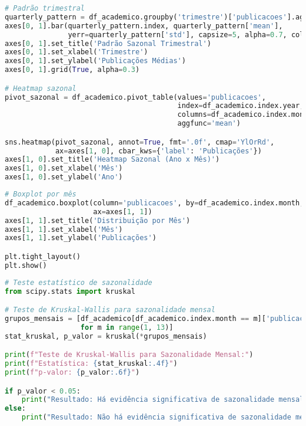 \begin{pythonbox}
\begin{lstlisting}[language=Python]
# Padrão trimestral
quarterly_pattern = df_academico.groupby('trimestre')['publicacoes'].agg(['mean', 'std'])
axes[0, 1].bar(quarterly_pattern.index, quarterly_pattern['mean'], 
               yerr=quarterly_pattern['std'], capsize=5, alpha=0.7, color='lightgreen')
axes[0, 1].set_title('Padrão Sazonal Trimestral')
axes[0, 1].set_xlabel('Trimestre')
axes[0, 1].set_ylabel('Publicações Médias')
axes[0, 1].grid(True, alpha=0.3)

# Heatmap sazonal
pivot_sazonal = df_academico.pivot_table(values='publicacoes', 
                                         index=df_academico.index.year, 
                                         columns=df_academico.index.month, 
                                         aggfunc='mean')

sns.heatmap(pivot_sazonal, annot=True, fmt='.0f', cmap='YlOrRd', 
            ax=axes[1, 0], cbar_kws={'label': 'Publicações'})
axes[1, 0].set_title('Heatmap Sazonal (Ano x Mês)')
axes[1, 0].set_xlabel('Mês')
axes[1, 0].set_ylabel('Ano')
\end{lstlisting}
\end{pythonbox}

\begin{pythonbox}
\begin{lstlisting}[language=Python]
# Boxplot por mês
df_academico.boxplot(column='publicacoes', by=df_academico.index.month, 
                     ax=axes[1, 1])
axes[1, 1].set_title('Distribuição por Mês')
axes[1, 1].set_xlabel('Mês')
axes[1, 1].set_ylabel('Publicações')

plt.tight_layout()
plt.show()
\end{lstlisting}
\end{pythonbox}

\begin{pythonbox}
\begin{lstlisting}[language=Python]
# Teste estatístico de sazonalidade
from scipy.stats import kruskal

# Teste de Kruskal-Wallis para sazonalidade mensal
grupos_mensais = [df_academico[df_academico.index.month == m]['publicacoes'].values 
                  for m in range(1, 13)]
stat_kruskal, p_valor = kruskal(*grupos_mensais)

print(f"Teste de Kruskal-Wallis para Sazonalidade Mensal:")
print(f"Estatística: {stat_kruskal:.4f}")
print(f"p-valor: {p_valor:.6f}")

if p_valor < 0.05:
    print("Resultado: Há evidência significativa de sazonalidade mensal")
else:
    print("Resultado: Não há evidência significativa de sazonalidade mensal")
\end{lstlisting}
\end{pythonbox}

